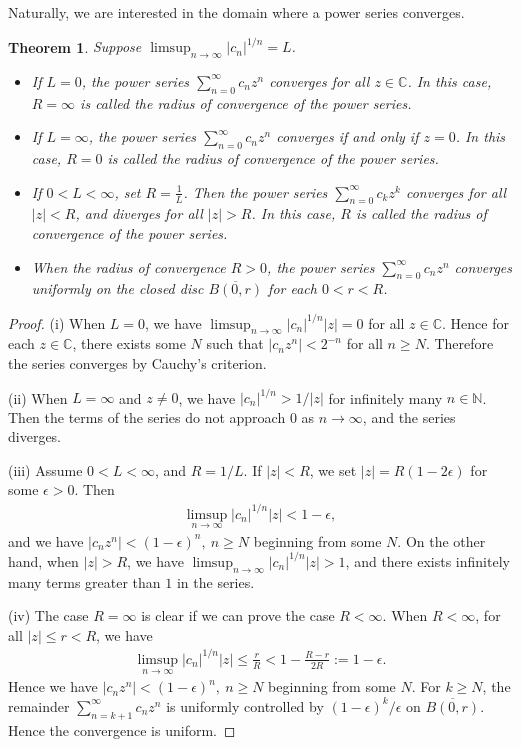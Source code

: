 \documentclass{article}
\numberwithin{equation}{section}
\newcommand{\bbC}{\mathbb{C}}
\newcommand{\bbN}{\mathbb{N}}
\newcommand{\ol}{\overline}
\theoremstyle{plain}
\newtheorem{theorem}{Theorem}[section]
\theoremstyle{definition}
\begin{document}
Naturally, we are interested in the domain where a power series converges.
\begin{theorem}\label{powercvg}
Suppose $\limsup_{n\to\infty}\vert c_n\vert^{1/n}=L$.
\begin{itemize}
\item[(i)] If $L=0$, the power series $\sum_{n=0}^\infty c_nz^n$ converges for all $z\in\bbC$. In this case, $R=\infty$ is called the radius of convergence of the power series.
\item[(ii)] If $L=\infty$, the power series $\sum_{n=0}^\infty c_nz^n$ converges if and only if $z=0$. In this case, $R=0$ is called the radius of convergence of the power series.
\item[(iii)] If $0<L<\infty$, set $R=\frac{1}{L}$. Then the power series $\sum_{n=0}^\infty c_kz^k$ converges for all $\vert z\vert<R$, and diverges for all $\vert z\vert>R$. In this case, $R$ is called the radius of convergence of the power series.
\item[(iv)] When the radius of convergence $R>0$, the power series $\sum_{n=0}^\infty c_nz^n$ converges uniformly on the closed disc $\ol{B(0,r)}$ for each $0<r<R$.
\end{itemize}
\end{theorem}
\begin{proof}
(i) When $L=0$, we have $\limsup_{n\to\infty}\vert c_n\vert^{1/n}\vert z\vert=0$ for all $z\in\bbC$. Hence for each $z\in\bbC$, there exists some
$N$ such that $\vert c_nz^n\vert<2^{-n}$ for all $n\geq N$. Therefore the series converges by Cauchy's criterion.

(ii) When $L=\infty$ and $z\neq 0$, we have $\vert c_n\vert^{1/n}>1/\vert z\vert$ for infinitely many $n\in\bbN$. Then the terms of the series do not approach $0$ as $n\to\infty$, and the series diverges.

(iii) Assume $0<L<\infty$, and $R=1/L$. If $\vert z\vert<R$, we set $\vert z\vert=R(1-2\epsilon)$ for some $\epsilon>0$. Then
\begin{align*}
	\limsup_{n\to\infty}\vert c_n\vert^{1/n}\vert z\vert<1-\epsilon,
\end{align*}
and we have $\vert c_nz^n\vert<(1-\epsilon)^n,\ n\geq N$ beginning from some $N$. On the other hand, when $\vert z\vert>R$, we have $\limsup_{n\to\infty}\vert c_n\vert^{1/n}\vert z\vert>1$, and there exists infinitely many terms greater than $1$ in the series.

(iv) The case $R=\infty$ is clear if we can prove the case $R<\infty$. When $R<\infty$, for all $\vert z\vert\leq r<R$, we have
\begin{align*}
	\limsup_{n\to\infty}\vert c_n\vert^{1/n}\vert z\vert\leq\frac{r}{R}< 1-\frac{R-r}{2R}:=1-\epsilon.
\end{align*}
Hence we have $\vert c_nz^n\vert<(1-\epsilon)^n,\ n\geq N$ beginning from some $N$. For $k\geq N$, the remainder $\sum_{n=k+1}^\infty c_nz^n$ is uniformly controlled by $(1-\epsilon)^k/\epsilon$ on $\ol{B(0,r)}$. Hence the convergence is uniform. 
\end{proof}
\end{document}
